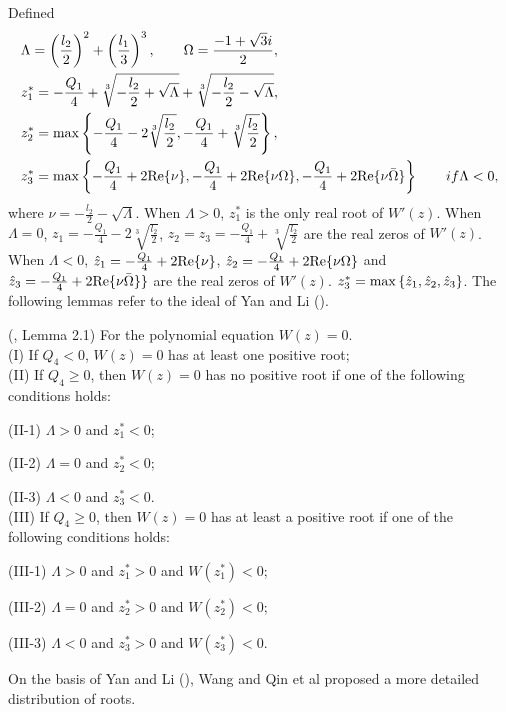 \documentclass{CMHPhD-SIVD}
\begin{document}
Defined
\begin{align*}
&\Lambda=\left(\frac{l_2}{2} \right)^2+\left(\frac{l_1}{3} \right)^3,  \qquad \Omega=\frac{-1+\sqrt{3}i}{2}, \\
&z_1^*=-\frac{Q_1}{4}+\sqrt[3]{-\frac{l_2}{2}+\sqrt{\Lambda}}+\sqrt[3]{-\frac{l_2}{2}-\sqrt{\Lambda}},\\
&z_2^*={\rm max}\left\{-\frac{Q_1}{4}-2\sqrt[3]{\frac{l_2}{2}}, -\frac{Q_1}{4}+\sqrt[3]{\frac{l_2}{2}}\right\},\\
&z_3^*={\rm max}\left\{-\frac{Q_1}{4}+2{\rm Re}\{\nu\}, -\frac{Q_1}{4}+2{\rm Re}\{\nu \Omega\}, -\frac{Q_1}{4}+2{\rm Re}\{\nu \bar{\Omega}\}\right\} \qquad if \Lambda<0,\\
\end{align*}
where $\nu=-\frac{l_2}{2}-\sqrt{\Lambda}$. When $\Lambda>0$, $z_1^*$ is the only real root of $W'(z)$. When $\Lambda=0$, $z_1=-\frac{Q_1}{4}-2\sqrt[3]{\frac{l_2}{2}}$, $z_2=z_3=-\frac{Q_1}{4}+\sqrt[3]{\frac{l_2}{2}}$ are the real zeros of $W'(z)$. When $\Lambda<0$, $\hat{z}_1=-\frac{Q_1}{4}+2{\rm Re}\{\nu\}$, $\hat{z}_2=-\frac{Q_1}{4}+2{\rm Re}\{\nu\Omega\}$ and $\hat{z}_3=-\frac{Q_1}{4}+2{\rm Re}\{\nu \bar{\Omega}\}\}$ are the real zeros of $W'(z)$. $z_3^*={\rm max}\left\{\hat{z}_1, \hat{z}_2, \hat{z}_3\right\}$. The following lemmas refer to the ideal of Yan and Li (\cite{yan2006stability}).

\begin{lemma}\label{3.1} (\cite{yan2006stability}, Lemma 2.1)
For the polynomial equation $W(z)=0$.\\
(I) If $Q_4<0$,  $W(z)=0$ has at least one positive root;\\
(II) If $Q_4\geq0$, then $W(z)=0$ has no positive root if one of the following conditions holds:

(II-1) $\Lambda>0$ and $z_1^*<0$;

(II-2) $\Lambda=0$ and $z_2^*<0$;

(II-3) $\Lambda<0$ and $z_3^*<0$.\\
(III) If $Q_4\geq0$, then $W(z)=0$ has at least a positive root if one of the following conditions holds:

(III-1) $\Lambda>0$ and $z_1^*>0$ and $W(z_1^*)<0$;

(III-2) $\Lambda=0$ and $z_2^*>0$ and $W(z_2^*)<0$;

(III-3) $\Lambda<0$ and $z_3^*>0$ and $W(z_3^*)<0$.
\end{lemma}


On the basis of Yan and Li (\cite{yan2006stability}), Wang and Qin et al \cite{wang2019hopf} proposed a more detailed distribution of roots.
\end{document}
